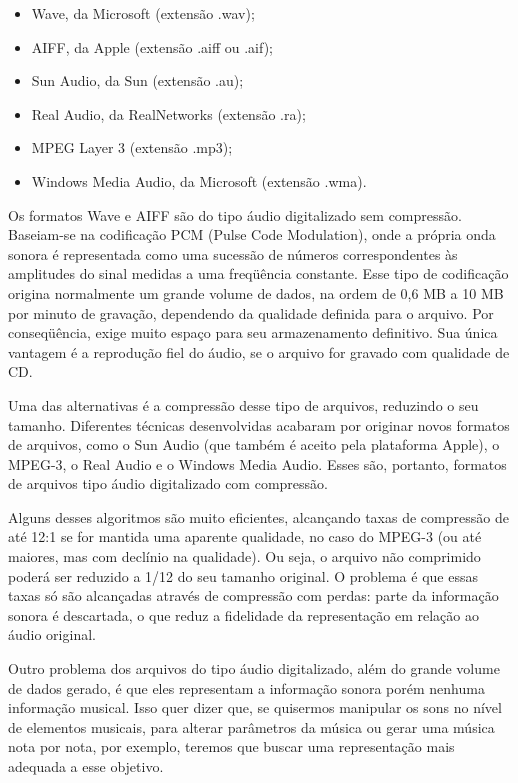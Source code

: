 \begin{itemize}
   \item Wave, da Microsoft (extensão .wav);
   \item AIFF, da Apple (extensão .aiff ou .aif);
   \item Sun Audio, da Sun (extensão .au);
   \item Real Audio, da RealNetworks (extensão .ra);
   \item MPEG Layer 3 (extensão .mp3);
   \item Windows Media Audio, da Microsoft (extensão .wma).
 \end{itemize}
 
 Os formatos Wave e AIFF são do tipo áudio digitalizado sem compressão. Baseiam-se na codificação PCM (Pulse Code Modulation), onde a própria onda sonora é representada como uma sucessão de números correspondentes às amplitudes do sinal medidas a uma freqüência constante. Esse tipo de codificação origina normalmente um grande volume de dados, na ordem de 0,6 MB a 10 MB por minuto de gravação, dependendo da qualidade definida para o arquivo. Por conseqüência, exige muito espaço para seu armazenamento definitivo. Sua única vantagem é a reprodução fiel do áudio, se o arquivo for gravado com qualidade de CD.

Uma das alternativas é a compressão desse tipo de arquivos, reduzindo o seu tamanho. Diferentes técnicas desenvolvidas acabaram por originar novos formatos de arquivos, como o Sun Audio (que também é aceito pela plataforma Apple), o MPEG-3, o Real Audio e o Windows Media Audio. Esses são, portanto, formatos de arquivos tipo áudio digitalizado com compressão.

Alguns desses algoritmos são muito eficientes, alcançando taxas de compressão de até 12:1 se for mantida uma aparente qualidade, no caso do MPEG-3 (ou até maiores, mas com declínio na qualidade). Ou seja, o arquivo não comprimido poderá ser reduzido a 1/12 do seu tamanho original. O problema é que essas taxas só são alcançadas através de compressão com perdas: parte da informação sonora é descartada, o que reduz a fidelidade da representação em relação ao áudio original.

Outro problema dos arquivos do tipo áudio digitalizado, além do grande volume de dados gerado, é que eles representam a informação sonora porém nenhuma informação musical. Isso quer dizer que, se quisermos manipular os sons no nível de elementos musicais, para alterar parâmetros da música ou gerar uma música nota por nota, por exemplo, teremos que buscar uma representação mais adequada a esse objetivo.

